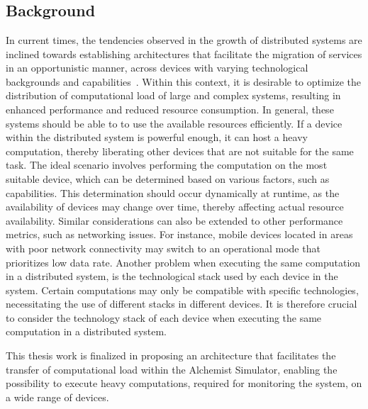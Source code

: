 \chapter{\introductionname}
\label{chap:introduction}
\section{Background}
\label{sec:background}

In current times, the tendencies observed in the growth of distributed systems are inclined towards establishing architectures that facilitate the migration of services in an opportunistic manner, across devices with varying technological backgrounds and capabilities~\cite{MISHRA2020149}. Within this context, it is desirable to optimize the distribution of computational load of large and complex systems, resulting in enhanced performance and reduced resource consumption. In general, these systems should be able to to use the available resources efficiently. If a device within the distributed system is powerful enough, it can host a heavy computation, thereby liberating other devices that are not suitable for the same task. The ideal scenario involves performing the computation on the most suitable device, which can be determined based on various factors, such as capabilities. This determination should occur dynamically at runtime, as the availability of devices may change over time, thereby affecting actual resource availability. Similar considerations can also be extended to other performance metrics, such as networking issues. For instance, mobile devices located in areas with poor network connectivity may switch to an operational mode that prioritizes low data rate.\newline
Another problem when executing the same computation in a distributed system, is the technological stack used by each device in the system. Certain computations may only be compatible with specific technologies, necessitating the use of different stacks in different devices. It is therefore crucial to consider the technology stack of each device when executing the same computation in a distributed system.\newline

This thesis work is finalized in proposing an architecture that facilitates the transfer of computational load within the Alchemist Simulator, enabling the possibility to execute heavy computations, required for monitoring the system, on a wide range of devices.

